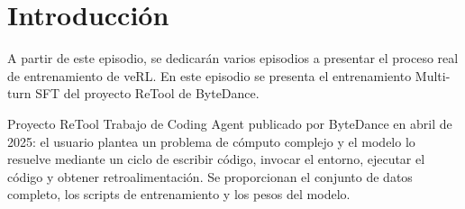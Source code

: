 \section{Introducción}
A partir de este episodio, se dedicarán varios episodios a presentar el proceso real de entrenamiento de veRL. En este episodio se presenta el entrenamiento Multi-turn SFT del proyecto ReTool de ByteDance.

\begin{importantbox}{Proyecto ReTool}
Trabajo de Coding Agent publicado por ByteDance en abril de 2025: el usuario plantea un problema de cómputo complejo y el modelo lo resuelve mediante un ciclo de escribir código, invocar el entorno, ejecutar el código y obtener retroalimentación. Se proporcionan el conjunto de datos completo, los scripts de entrenamiento y los pesos del modelo.
\end{importantbox}

